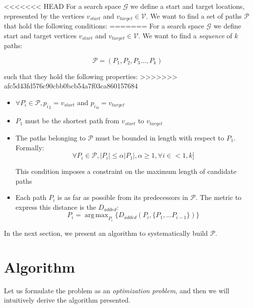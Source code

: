 \documentclass[graybox]{svmult}
\newcommand{\PathSet}{\ensuremath{\mathcal P} }
\newcommand{\PathSequence}{\ensuremath{\mathcal P} }
\newcommand{\Path}{\ensuremath{P} }
\newcommand{\Graph}{\ensuremath{\mathcal G} }
\newcommand{\VertexSet}{\ensuremath{\mathcal V} }
\newcommand{\AddedDistance}{\ensuremath{D_{added}} }
\DeclareMathOperator*{\argmax}{arg\,max}
\begin{document}
\begin{definition}
<<<<<<< HEAD
\label{def:DiversePathProblem}
For a search space \Graph we define a start and target locations, represented by the vertices $v_{start}$ and $v_{target} \in \VertexSet$.  We want to find a set of paths $\PathSet$ that hold the following conditions:
=======
For a search space \Graph we define start and target vertices $v_{start}$ and $v_{target} \in \VertexSet$.  We want to find a \emph{sequence} of $k$ paths:

\[ \PathSequence = ( \Path_{1}, \Path_{2}, \Path_{3}..., \Path_{k} )  \]

such that they hold the following properties:
>>>>>>> afc5d43fd576c90cbb0bcb54a7f03ca860157684

\begin{itemize}
\item{ $ \forall \Path_{i} \in \PathSequence, {p_{i}}_{1} = v_{start}$ and ${p_{i}}_{n} = v_{target}$}
\item{ $\Path_{1}$ must be the shortest path from $v_{start}$ to $v_{target}$ }
\item{The paths belonging to $\PathSet$ must be bounded in length with respect to $\Path_{1}$. Formally:
\begin{equation} 
\forall \Path_{i} \in \PathSet, \left | \Path_{i} \right | \leq \alpha \left| \Path_{1} \right |, \alpha \geq 1, \forall i \in <1, k ] 
\label{eq:LengthBound}
\end{equation}

This condition imposes a constraint on the maximum length of candidate paths}
\item{Each path $\Path_{i}$ is as far as possible from its predecessors in $\PathSequence$. The metric to express this distance is the $\AddedDistance$:
	\begin{equation}
		\Path_{i} = \argmax_{\Path_{i}}  \{ \AddedDistance ( \Path_{i}, \{ \Path _{1},...\Path _{i-1} \} ) \}
		\label{eq:MaxDistance}	
	\end{equation}
}

\end{itemize}
\end{definition}

In the next section, we present an algorithm to systematically build $\PathSet$.

\section{Algorithm}
Let us formulate the problem as an \emph{optimization problem}, and then we will intuitively derive the algorithm presented.
\end{document}
